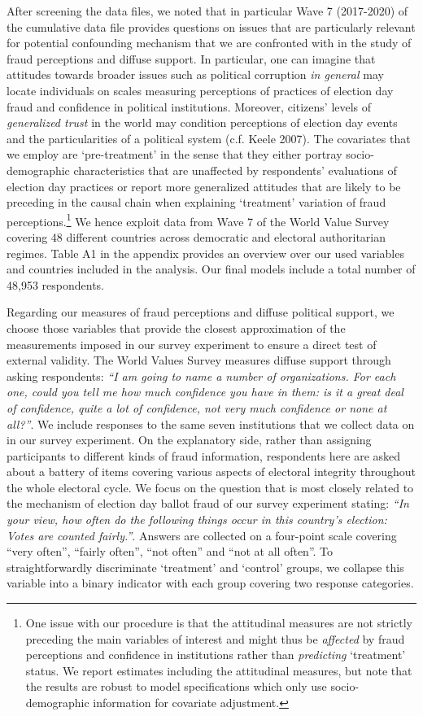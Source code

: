 \documentclass[11pt, ngerman,english,a4]{article}
\begin{document}
After screening the data files, we noted that in particular Wave 7 (2017-2020) of the cumulative data file provides questions on issues that are particularly relevant for potential confounding mechanism that we are confronted with in the study of fraud perceptions and diffuse support. In particular, one can imagine that attitudes towards broader issues such as political corruption \textit{in general} may locate individuals on scales measuring perceptions of practices of election day fraud and confidence in political institutions. Moreover, citizens' levels of \textit{generalized trust} in the world may condition perceptions of election day events and the particularities of a political system (c.f. Keele 2007). The covariates that we employ are `pre-treatment' in the sense that they either portray socio-demographic characteristics that are unaffected by respondents' evaluations of election day practices or report more generalized attitudes that are likely to be preceding in the causal chain when explaining `treatment' variation of fraud perceptions.\footnote{One issue with our procedure is that the attitudinal measures are not strictly preceding the main variables of interest and might thus be \textit{affected} by fraud perceptions and confidence in institutions rather than \textit{predicting} `treatment' status. We report estimates including the attitudinal measures, but note that the results are robust to model specifications which only use socio-demographic information for covariate adjustment.} We hence exploit data from Wave 7 of the World Value Survey covering 48 different countries across democratic and electoral authoritarian regimes. Table A1 in the appendix provides an overview over our used variables and countries included in the analysis. Our final models include a total number of 48,953 respondents. 

Regarding our measures of fraud perceptions and diffuse political support, we choose those variables that provide the closest approximation of the measurements imposed in our survey experiment to ensure a direct test of external validity. The World Values Survey measures diffuse support through asking respondents: \textit{“I am going to name a number of organizations. For each one, could you tell me how much confidence you have in them: is it a great deal of confidence, quite a lot of confidence, not very much confidence or none at all?”}. We include responses to the same seven institutions that we collect data on in our survey experiment. On the explanatory side, rather than assigning participants to different kinds of fraud information, respondents here are asked about a battery of items covering various aspects of electoral integrity throughout the whole electoral cycle. We focus on the question that is most closely related to the mechanism of election day ballot fraud of our survey experiment stating: \textit{“In your view, how often do the following things occur in this country's election: Votes are counted fairly.”}. Answers are collected on a four-point scale covering “very often”, “fairly often”, “not often” and “not at all often”. To straightforwardly discriminate `treatment' and `control' groups, we collapse this variable into a binary indicator with each group covering two response categories.  
\end{document}
